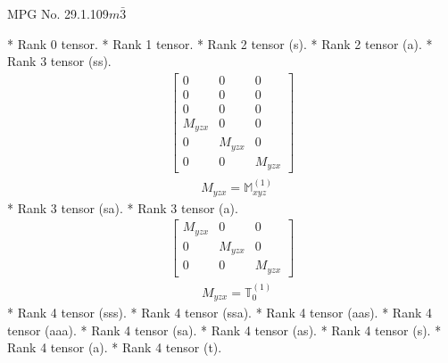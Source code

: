 \documentclass[fleqn,8pt,landscape]{jsarticle}
\begin{document}
\setcounter{MaxMatrixCols}{32}

\renewcommand{\tablename}{Table~}
\renewcommand{\figurename}{Figure~}
\begin{center}
\LARGE
MPG No. 29.1.109\quad$m\bar{3}$
\end{center}
* Rank 0 tensor.
* Rank 1 tensor.
* Rank 2 tensor (s).
* Rank 2 tensor (a).
* Rank 3 tensor (ss).
\begin{align*}
\begin{bmatrix} 0 & 0 & 0 \\ 0 & 0 & 0 \\ 0 & 0 & 0 \\ M_{yzx} & 0 & 0 \\ 0 & M_{yzx} & 0 \\ 0 & 0 & M_{yzx} \end{bmatrix}
\end{align*}
\begin{align*}
& M_{yzx} = \mathbb{M}_{xyz}^{(1)}
\end{align*}
* Rank 3 tensor (sa).
* Rank 3 tensor (a).
\begin{align*}
\begin{bmatrix} M_{yzx} & 0 & 0 \\ 0 & M_{yzx} & 0 \\ 0 & 0 & M_{yzx} \end{bmatrix}
\end{align*}
\begin{align*}
& M_{yzx} = \mathbb{T}_{0}^{(1)}
\end{align*}
* Rank 4 tensor (sss).
* Rank 4 tensor (ssa).
* Rank 4 tensor (aas).
* Rank 4 tensor (aaa).
* Rank 4 tensor (sa).
* Rank 4 tensor (as).
* Rank 4 tensor (s).
* Rank 4 tensor (a).
* Rank 4 tensor (t).
\end{document}
